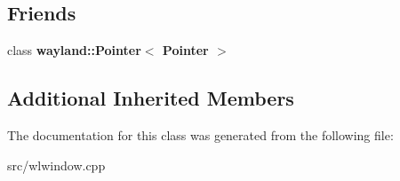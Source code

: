 \subsection*{Friends}
\begin{DoxyCompactItemize}
\item 
\mbox{\label{classPointer_a279e4310a52ab6abeb11dc58318f3915}} 
class {\bfseries wayland\+::\+Pointer$<$ Pointer $>$}
\end{DoxyCompactItemize}
\subsection*{Additional Inherited Members}


The documentation for this class was generated from the following file\+:\begin{DoxyCompactItemize}
\item 
src/wlwindow.\+cpp\end{DoxyCompactItemize}
